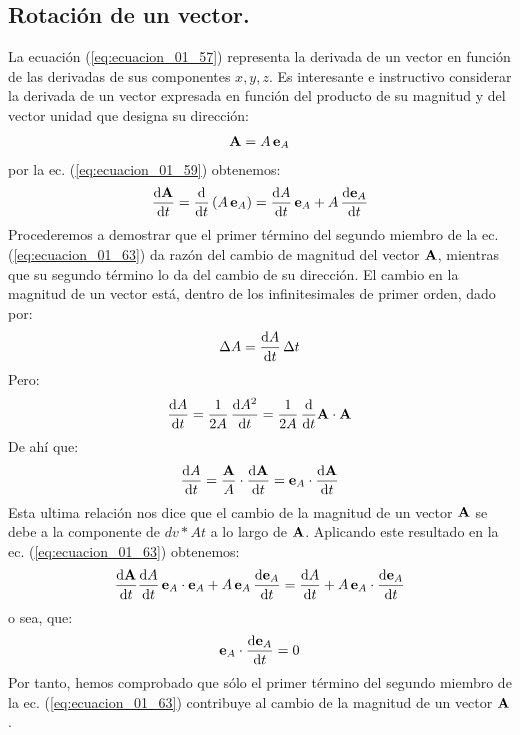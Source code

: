 \documentclass[12pt]{article}
\begin{document}
\subsection{Rotación de un vector.}

La ecuación (\ref{eq:ecuacion_01_57}) representa la derivada de un vector en función de las derivadas de sus componentes $x, y, z$. Es interesante e instructivo considerar la derivada de un vector expresada en función del producto de su magnitud y del vector unidad que designa su dirección:
\begin{align*}
    \vb{A} = A \, \vb{e}_{A}
\end{align*}
por la ec. (\ref{eq:ecuacion_01_59}) obtenemos:
\begin{align}
    \dv{\vb{A}}{t} = \dv{t} \left( A \, \vb{e}_{A} \right) = \dv{A}{t} \, \vb{e}_{A} + A \, \dv{\vb{e}_{A}}{t}
    \label{eq:ecuacion_01_63}
\end{align}
Procederemos a demostrar que el primer término del segundo miembro de la ec. (\ref{eq:ecuacion_01_63}) da razón del cambio de magnitud del vector $\vb{A}$, mientras que su segundo término lo da del cambio de su dirección. El cambio en la magnitud de un vector está, dentro de los infinitesimales de primer orden, dado por:
\begin{align*}
    \Delta A = \dv{A}{t} \, \Delta t
\end{align*}
Pero:
\begin{align*}
    \dv{A}{t} =\dfrac{1}{2 A} \, \dv{A^{2}}{t} = \dfrac{1}{2 A} \, \dv{t} \vb{A} \cdot \vb{A} 
\end{align*}
De ahí que:
\begin{align}
    \dv{A}{t} = \dfrac{\vb{A}}{A} \cdot \dv{\vb{A}}{t} = \vb{e}_{A} \cdot \dv{\vb{A}}{t}
    \label{eq:ecuacion_01_64}
\end{align}
Esta ultima relación nos dice que el cambio de la magnitud de un vector $\vb{A}$ se debe a la componente de $dv*{A}{t}$ a lo largo de $\vb{A}$. Aplicando este resultado en la ec. (\ref{eq:ecuacion_01_63}) obtenemos:
\begin{align}
    \dv{\vb{A}}{t} \dv{A}{t} \, \vb{e}_{A} \cdot \vb{e}_{A} + A \, \vb{e}_{A} \, \dv{\vb{e}_{A}}{t} = \dv{A}{t} + A \, \vb{e}_{A} \cdot \dv{\vb{e}_{A}}{t}
    \label{eq:ecuacion_01_65}
\end{align}
o sea, que:
\begin{align}
    \vb{e}_{A} \cdot \dv{\vb{e}_{A}}{t} = 0
    \label{eq:ecuacion_01_66}
\end{align}
Por tanto, hemos comprobado que sólo el primer término del segundo miembro de la ec. (\ref{eq:ecuacion_01_63}) contribuye al cambio de la magnitud de un vector $\vb{A}$. 
\end{document}
